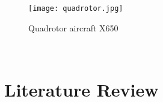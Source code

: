 \begin{figure}[h]
\begin{center}
\texttt{[image: quadrotor.jpg]}    
\caption[Quadrotor aircraft X650]{Quadrotor aircraft X650 \protect\footnotemark} 
\label{fig:quadrotarywing}
\end{center}
\end{figure}
\\

%

\section{Literature Review}


